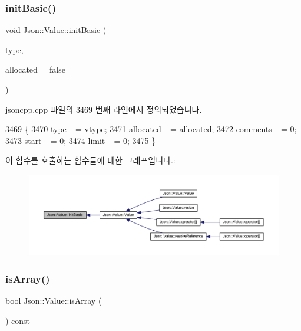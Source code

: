 \subsubsection{\texorpdfstring{init\+Basic()}{initBasic()}}
{\footnotesize\ttfamily void Json\+::\+Value\+::init\+Basic (\begin{DoxyParamCaption}\item[{\hyperlink{namespace_json_a7d654b75c16a57007925868e38212b4e}{Value\+Type}}]{type,  }\item[{bool}]{allocated = {\ttfamily false} }\end{DoxyParamCaption})\hspace{0.3cm}{\ttfamily [private]}}



jsoncpp.\+cpp 파일의 3469 번째 라인에서 정의되었습니다.


\begin{DoxyCode}
3469                                                      \{
3470   \hyperlink{class_json_1_1_value_abd222c2536dc88bf330dedcd076d2356}{type\_} = vtype;
3471   \hyperlink{class_json_1_1_value_ae0126c80dc4907aad94088553fc7632b}{allocated\_} = allocated;
3472   \hyperlink{class_json_1_1_value_a2016564cabc7a29208e97bd0b782a4e4}{comments\_} = 0;
3473   \hyperlink{class_json_1_1_value_a1c3aeb0fa8fefe93776cb347c76a25a8}{start\_} = 0;
3474   \hyperlink{class_json_1_1_value_afe377e25f6d3b5b8ea7221c84f29412a}{limit\_} = 0;
3475 \}
\end{DoxyCode}
이 함수를 호출하는 함수들에 대한 그래프입니다.\+:\nopagebreak
\begin{figure}[H]
\begin{center}
\leavevmode
\includegraphics[width=350pt]{class_json_1_1_value_a32b86b71564157f40f880f5736be822a_icgraph}
\end{center}
\end{figure}
\mbox{\label{class_json_1_1_value_a1627eb9d6568d6d0252fa8bb711c0a59}} 
\subsubsection{\texorpdfstring{is\+Array()}{isArray()}}
{\footnotesize\ttfamily bool Json\+::\+Value\+::is\+Array (\begin{DoxyParamCaption}{ }\end{DoxyParamCaption}) const}



